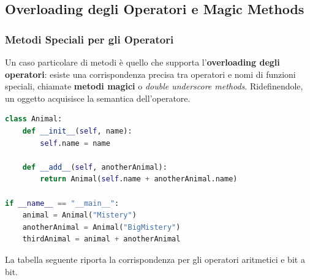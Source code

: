 \documentclass[12pt]{extarticle}
\begin{document}
\subsection{Overloading degli Operatori e Magic Methods}

\subsubsection{Metodi Speciali per gli Operatori}

\noindent Un caso particolare di metodi è quello che supporta l'\textbf{overloading degli operatori}: esiste una corrispondenza precisa tra operatori e nomi di funzioni speciali, chiamate \textbf{metodi magici} o \emph{double underscore methods}. Ridefinendole, un oggetto acquisisce la semantica dell'operatore.

\begin{lstlisting}[language=Python]
class Animal:
    def __init__(self, name):
        self.name = name

    def __add__(self, anotherAnimal):
        return Animal(self.name + anotherAnimal.name)

if __name__ == "__main__":
    animal = Animal("Mistery")
    anotherAnimal = Animal("BigMistery")
    thirdAnimal = animal + anotherAnimal
\end{lstlisting}

\noindent La tabella seguente riporta la corrispondenza per gli operatori aritmetici e bit a bit.
\end{document}
